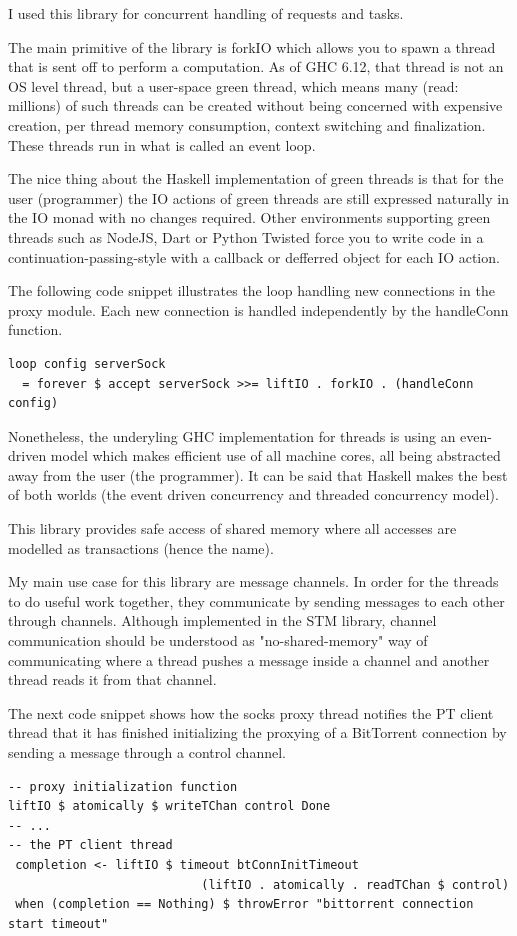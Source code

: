 \documentclass[11pt]{article} %
\begin{document}

I used this library for concurrent handling of requests and tasks.

The main primitive of the library is forkIO which allows you to spawn a thread that is sent off to perform a computation. As of GHC 6.12, that thread is not an OS level thread, but a user-space green thread, which means many (read: millions) of such threads can be created without being concerned with expensive creation, per thread memory consumption, context switching and finalization. These threads run in what is called an event loop.

The nice thing about the Haskell implementation of green threads is that for the user (programmer) the IO actions of green threads are still expressed naturally in the IO monad with no changes required. Other environments supporting green threads such as NodeJS, Dart or Python Twisted force you to write code in a continuation-passing-style with a callback or defferred object for each IO action. 

The following code snippet illustrates the loop handling new connections in the proxy module. Each new connection is handled independently by the handleConn function.

\begin{lstlisting}
loop config serverSock
  = forever $ accept serverSock >>= liftIO . forkIO . (handleConn config)
\end{lstlisting}

Nonetheless, the underyling GHC implementation for threads is using an even-driven model which makes efficient use of all machine cores, all being abstracted away from the user (the programmer). It can be said that Haskell makes the best of both worlds (the event driven concurrency and threaded concurrency model).

This library provides safe access of shared memory where all accesses are modelled as transactions (hence the name).

My main use case for this library are message channels. In order for the threads to do useful work together, they communicate by sending messages to each other through channels. Although implemented in the STM library, channel communication should be understood as "no-shared-memory" way of communicating where a thread pushes a message inside a channel and another thread reads it from that channel.

The next code snippet shows how the socks proxy thread notifies the PT client thread that it has finished initializing the proxying of a BitTorrent connection by sending a message through a control channel.
\begin{lstlisting}
-- proxy initialization function
liftIO $ atomically $ writeTChan control Done
-- ...
-- the PT client thread 
 completion <- liftIO $ timeout btConnInitTimeout
		                   (liftIO . atomically . readTChan $ control)
 when (completion == Nothing) $ throwError "bittorrent connection start timeout"
\end{lstlisting}
\end{document}
